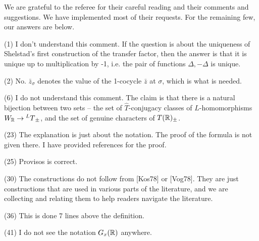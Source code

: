 \documentclass{article}
\renewcommand{\-}{\hyp{}}
\numberwithin{equation}{section}
\begin{document}
We are grateful to the referee for their careful reading and their comments and suggestions. We have implemented most of their requests. For the remaining few, our answers are below.

(1) I don't understand this comment. If the question is about the uniqueness of Shelstad's first construction of the transfer factor, then the answer is that it is unique up to multiplication by -1, i.e. the pair of functions ${\Delta,-\Delta}$ is unique.

(2) No. $\bar z_\sigma$ denotes the value of the 1-cocycle $\bar z$ at $\sigma$, which is what is needed.


(6) I do not understand this comment. The claim is that there is a natural bijection between two sets -- the set of $\hat T$-conjugacy classes of $L$-homomorphisms $W_{\mathbb{R}} \to {^LT}_\pm$, and the set of genuine characters of $T(\mathbb{R})_\pm$.

(23) The explanation is just about the notation. The proof of the formula is not given there. I have provided references for the proof.

(25) Provisos is correct.

(30) The constructions do not follow from [Kos78] or [Vog78]. They are just constructions that are used in various parts of the literature, and we are collecting and relating them to help readers navigate the literature.

(36) This is done 7 lines above the definition.

(41) I do not see the notation $G_x(\mathbb{R})$ anywhere.
\end{document}
